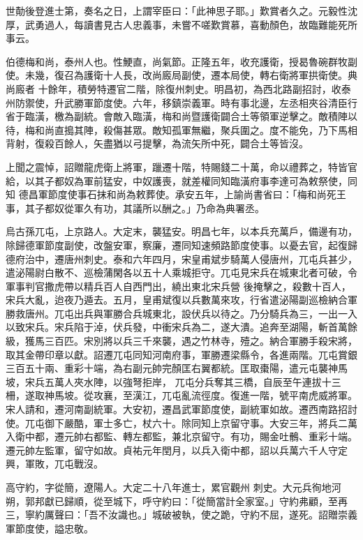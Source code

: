 \begin{pinyinscope}
 世勣後登進士第，奏名之日，上謂宰臣曰：「此神思子耶。」歎賞者久之。元毅性沈厚，武勇過人，每讀書見古人忠義事，未嘗不嗟歎賞慕，喜動顏色，故臨難能死所事云。



 伯德梅和尚，泰州人也。性鯁直，尚氣節。正隆五年，收充護衛，授曷魯碗群牧副使。未幾，復召為護衛十人長，改尚廄局副使，遷本局使，轉右衛將軍拱衛使。典尚廄者
 十餘年，積勞特遷官二階，除復州刺史。明昌初，為西北路副招討，收泰州防禦使，升武勝軍節度使。六年，移鎮崇義軍。時有事北邊，左丞相夾谷清臣行省于臨潢，檄為副統。會敵入臨潢，梅和尚暨護衛闢合土等領軍逆擊之。敵積陣以待，梅和尚直搗其陣，殺傷甚眾。敵知孤軍無繼，聚兵圍之。度不能免，乃下馬相背射，復殺百餘人，矢盡猶以弓提擊，為流矢所中死，闢合土等皆沒。



 上聞之震悼，詔贈龍虎衛上將軍，躐遷十階，特賜錢二十萬，命以禮葬之，特皆官給，以其子都奴為軍前猛安，中奴護喪，就差權同知臨潢府事李達可為敕祭使，同知
 德昌軍節度使事石抹和尚為敕葬使。承安五年，上諭尚書省曰：「梅和尚死王事，其子都奴從軍久有功，其議所以酬之。」乃命為典署丞。



 烏古孫兀屯，上京路人。大定末，襲猛安。明昌七年，以本兵充萬戶，備邊有功，除歸德軍節度副使，改盤安軍，察廉，遷同知速頻路節度使事。以憂去官，起復歸德府治中，遷唐州刺史。泰和六年四月，宋皇甫斌步騎萬人侵唐州，兀屯兵甚少，遣泌陽尉白散不、巡檢蒲閑各以五十人乘城拒守。兀屯見宋兵在城東北者可破，令軍事判官撒虎帶以精兵百人自西門出，繞出東北宋兵營
 後掩擊之，殺數十百人，宋兵大亂，迨夜乃遁去。五月，皇甫斌復以兵數萬來攻，行省遣泌陽副巡檢納合軍勝救唐州。兀屯出兵與軍勝合兵城東北，設伏兵以待之。乃分騎兵為三，一出一入以致宋兵。宋兵陷于淖，伏兵發，中衝宋兵為二，遂大潰。追奔至湖陽，斬首萬餘級，獲馬三百匹。宋別將以兵三千來襲，遇之竹林寺，殪之。納合軍勝手殺宋將，取其金帶印章以獻。詔遷兀屯同知河南府事，軍勝遷梁縣令，各進兩階。兀屯賞銀三百五十兩、重彩十端，為右副元帥完顏匡右翼都統。匡取棗陽，遣元屯襲神馬坡，宋兵五萬人夾水陣，以強弩拒岸，
 兀屯分兵奪其三橋，自辰至午連拔十三柵，遂取神馬坡。從攻襄，至漢江，兀屯亂流徑度。復進一階，號平南虎威將軍。宋人請和，遷河南副統軍。大安初，遷昌武軍節度使，副統軍如故。遷西南路招討使。兀屯御下嚴酷，軍士多亡，杖六十。除同知上京留守事。大安三年，將兵二萬入衛中都，遷元帥右都監、轉左都監，兼北京留守。有功，賜金吐鶻、重彩十端。遷元帥左監軍，留守如故。貞祐元年閏月，以兵入衛中都，詔以兵萬六千人守定興，軍敗，兀屯戰沒。



 高守約，字從簡，遼陽人。大定二十八年進士，累官觀州
 刺史。大元兵徇地河朔，郭邦獻已歸順，從至城下，呼守約曰：「從簡當計全家室。」守約弗顧，至再三，寧約厲聲曰：「吾不汝識也。」城破被執，使之跪，守約不屈，遂死。詔贈崇義軍節度使，謚忠敬。




\end{pinyinscope}
